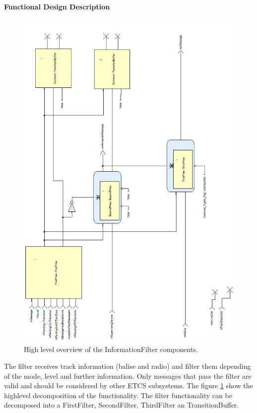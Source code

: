 \paragraph{Functional Design Description}

\begin{figure}
\centering
\includegraphics [width=\textwidth]{images/informationfilter-high-level-rot.png}
\caption{High level overview of the InformationFilter components.}
\label{fig:InformationFilterHighLevel}
\end{figure}

The filter receives track information (balise and radio) and filter
them depending of the mode, level and further information. Only
messages that pass the filter are valid and should be considered by
other ETCS subsystems. The figure \ref{fig:InformationFilterHighLevel}
show the high\-level decomposition of the functionality. The filter
functionality can be decomposed into a FirstFilter, SecondFilter,
ThirdFilter an TransitionBuffer.

